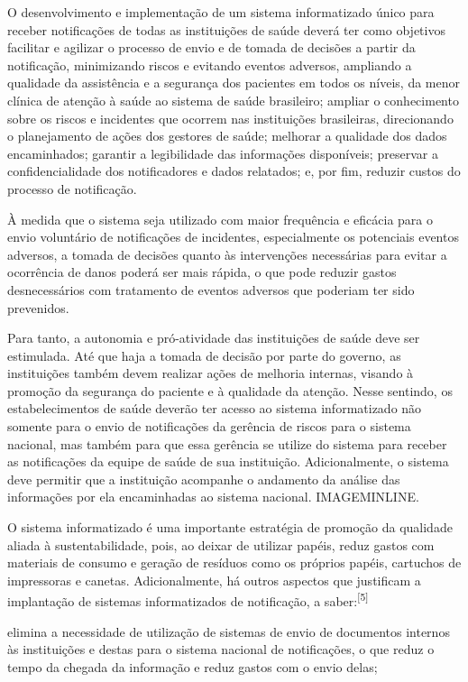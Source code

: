 \documentclass{article}
\begin{document}
O desenvolvimento e implementação de um sistema informatizado único para receber
notificações de todas as instituições de saúde deverá ter como objetivos
facilitar e
agilizar o processo de envio e de tomada de decisões a partir da notificação,
minimizando
riscos e evitando eventos adversos, ampliando a qualidade da assistência e a
segurança dos
pacientes em todos os níveis, da menor clínica de atenção à saúde ao sistema de
saúde
brasileiro; ampliar o conhecimento sobre os riscos e incidentes que ocorrem nas
instituições
brasileiras, direcionando o planejamento de ações dos gestores de saúde;
melhorar a
qualidade dos dados encaminhados; garantir a legibilidade das informações
disponíveis;
preservar a confidencialidade dos notificadores e dados relatados; e, por fim,
reduzir
custos do processo de notificação.

À medida que o sistema seja utilizado com maior frequência e eficácia para o
envio
voluntário de notificações de incidentes, especialmente os potenciais eventos
adversos, a
tomada de decisões quanto às intervenções necessárias para evitar a ocorrência
de danos
poderá ser mais rápida, o que pode reduzir gastos desnecessários com tratamento
de eventos
adversos que poderiam ter sido prevenidos.

Para tanto, a autonomia e pró-atividade das instituições de saúde deve ser
estimulada. Até
que haja a tomada de decisão por parte do governo, as instituições também devem
realizar
ações de melhoria internas, visando à promoção da segurança do paciente e à
qualidade da
atenção. Nesse sentindo, os estabelecimentos de saúde deverão ter acesso ao
sistema
informatizado não somente para o envio de notificações da gerência de riscos
para o sistema
nacional, mas também para que essa gerência se utilize do sistema para receber
as
notificações da equipe de saúde de sua instituição. Adicionalmente, o sistema
deve permitir
que a instituição acompanhe o andamento da análise das informações por ela
encaminhadas ao
sistema nacional. IMAGEMINLINE.

O sistema informatizado é uma importante estratégia de promoção da qualidade
aliada à
sustentabilidade, pois, ao deixar de utilizar papéis, reduz gastos com materiais
de consumo
e geração de resíduos como os próprios papéis, cartuchos de impressoras e
canetas.
Adicionalmente, há outros aspectos que justificam a implantação de sistemas
informatizados
de notificação, a saber:\textsuperscript{[5]}

elimina a necessidade de utilização de sistemas de envio de documentos internos
às
instituições e destas para o sistema nacional de notificações, o que reduz o
tempo da
chegada da informação e reduz gastos com o envio delas;
\end{document}
